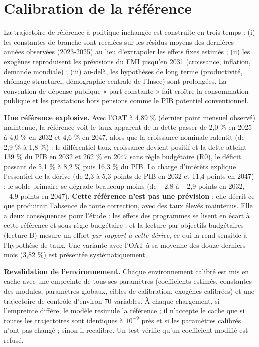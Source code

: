 \documentclass[
  11pt,
  11pt,
  a4paper,
  openany]{book}
\begin{document}
\hypertarget{sec:calibration}{%
\section{Calibration de la référence}\label{sec:calibration}}

La trajectoire de référence à politique inchangée est construite en
trois temps : (i) les constantes de branche sont recalées sur les
résidus moyens des dernières années observées (2023-2025) au lieu
d'extrapoler les effets fixes estimés ; (ii) les exogènes reproduisent
les prévisions du FMI jusqu'en 2031 (croissance, inflation, demande
mondiale) ; (iii) au-delà, les hypothèses de long terme (productivité,
chômage structurel, démographie centrale de l'Insee) sont prolongées. La
convention de dépense publique « part constante » fait croître la
consommation publique et les prestations hors pensions comme le PIB
potentiel conventionnel.

\textbf{Une référence explosive.} Avec l'OAT à 4,89 \% (dernier point
mensuel observé) maintenue, la référence voit le taux apparent de la
dette passer de 2,0 \% en 2025 à 4,0 \% en 2032 et 4,6 \% en 2047, alors
que la croissance nominale ralentit (de 2,9 \% à 1,8 \%) : le
différentiel taux-croissance devient positif et la dette atteint 139 \%
du PIB en 2032 et 262 \% en 2047 sans règle budgétaire (R0), le déficit
passant de 5,1 \% à 8,2 \% puis 16,3 \% du PIB. La charge d'intérêts
explique l'essentiel de la dérive (de 2,3 à 5,3 points de PIB en 2032 et
11,4 points en 2047) ; le solde primaire se dégrade beaucoup moins (de
−2,8 à −2,9 points en 2032, −4,9 points en 2047). \textbf{Cette
référence n'est pas une prévision} : elle décrit ce que produirait
l'absence de toute correction, avec des taux élevés maintenus. Elle a
deux conséquences pour l'étude : les effets des programmes se lisent en
écart à cette référence et sous règle budgétaire ; et la lecture par
objectifs budgétaires (lecture B) mesure un effort \emph{par rapport à
cette dérive}, ce qui la rend sensible à l'hypothèse de taux. Une
variante avec l'OAT à sa moyenne des douze derniers mois (3,82 \%) est
présentée systématiquement.

\textbf{Revalidation de l'environnement.} Chaque environnement calibré
est mis en cache avec une empreinte de tous ses paramètres (coefficients
estimés, constantes des modules, paramètres globaux, cibles de
calibration, exogènes calibrées) et une trajectoire de contrôle
d'environ 70 variables. À chaque chargement, si l'empreinte diffère, le
modèle resimule la référence ; il n'accepte le cache que si toutes les
trajectoires sont identiques à \(10^{-9}\) près et si les paramètres
calibrés n'ont pas changé ; sinon il recalibre. Un test vérifie qu'un
coefficient modifié est refusé.
\end{document}
